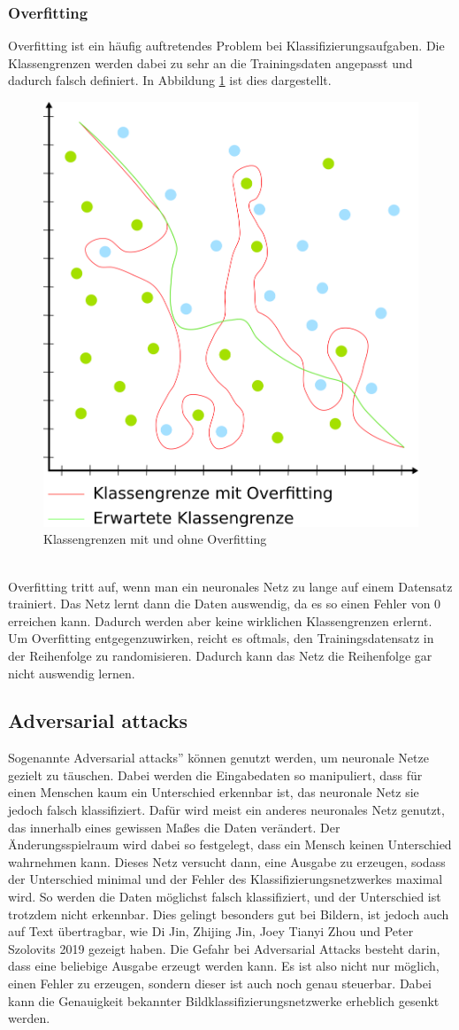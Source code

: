 \documentclass[11pt]{article}
\begin{document}
\subsubsection{Overfitting}
Overfitting ist ein häufig auftretendes Problem bei Klassifizierungsaufgaben. Die Klassengrenzen werden dabei zu sehr an die Trainingsdaten angepasst und dadurch falsch definiert. In Abbildung \ref{Overfitting} ist dies dargestellt.
\begin{figure}[h]
	\centering
	\includegraphics[width=0.5\linewidth]{../graphics/overfitting.png}
	\caption{Klassengrenzen mit und ohne Overfitting}
	\label{Overfitting}
\end{figure}
\\
Overfitting tritt auf, wenn man ein neuronales Netz zu lange auf einem Datensatz trainiert. Das Netz lernt dann die Daten auswendig, da es so einen Fehler von 0 erreichen kann. Dadurch werden aber keine wirklichen Klassengrenzen erlernt.\\
Um Overfitting entgegenzuwirken, reicht es oftmals, den Trainingsdatensatz in der Reihenfolge zu randomisieren. Dadurch kann das Netz die Reihenfolge gar nicht auswendig lernen.
\subsection{Adversarial attacks}
Sogenannte \glqq Adversarial attacks'' können genutzt werden, um neuronale Netze gezielt zu täuschen. Dabei werden die Eingabedaten so manipuliert, dass für einen Menschen kaum ein Unterschied erkennbar ist, das neuronale Netz sie jedoch falsch klassifiziert. Dafür wird meist ein anderes neuronales Netz genutzt, das innerhalb eines gewissen Maßes die Daten verändert. Der Änderungsspielraum wird dabei so festgelegt, dass ein Mensch keinen Unterschied wahrnehmen kann. Dieses Netz versucht dann, eine Ausgabe zu erzeugen, sodass der Unterschied minimal und der Fehler des Klassifizierungsnetzwerkes maximal wird. So werden die Daten möglichst falsch klassifiziert, und der Unterschied ist trotzdem nicht erkennbar. Dies gelingt besonders gut bei Bildern, ist jedoch auch auf Text übertragbar, wie Di Jin, Zhijing Jin, Joey Tianyi Zhou und Peter Szolovits 2019 gezeigt haben\cite{8}. Die Gefahr bei Adversarial Attacks besteht darin, dass eine beliebige Ausgabe erzeugt werden kann. Es ist also nicht nur möglich, einen Fehler zu erzeugen, sondern dieser ist auch noch genau steuerbar. Dabei kann die Genauigkeit bekannter Bildklassifizierungsnetzwerke erheblich gesenkt werden\cite{9}. 
\end{document}
